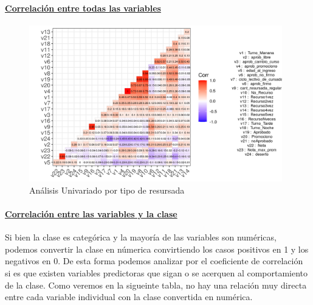 \hypertarget{correlaciuxf3n-entre-todas-las-variables}{%
	\paragraph{\underline{\textbf{Correlación entre todas las variables}}}\label{correlaciuxf3n-entre-todas-las-variables}}


\begin{figure}[!htb]
	\centering
	\includegraphics[width=0.98\textwidth]{imagenes/imagenes/gg_corr_todas_variables_leyenda.png}
	\caption{Análisis Univariado por tipo de resursada}
	\label{fig:tablon_correlacion}
\end{figure}

\hypertarget{correlaciuxf3n-entre-las-variables-y-la-clase}{%
	\paragraph{\underline{Correlación entre las variables y la clase}}\label{correlaciuxf3n-entre-las-variables-y-la-clase}}

Si bien la clase es categórica y la mayoría de las variables son
numéricas, podemos convertir la clase en númerica convirtiendo los casos
positivos en 1 y los negativos en 0. De esta forma podemos analizar por
el coeficiente de correlación si es que existen variables predictoras
que sigan o se acerquen al comportamiento de la clase. Como veremos en
la sigueinte tabla, no hay una relación muy directa entre cada variable
individual con la clase convertida en numérica.




